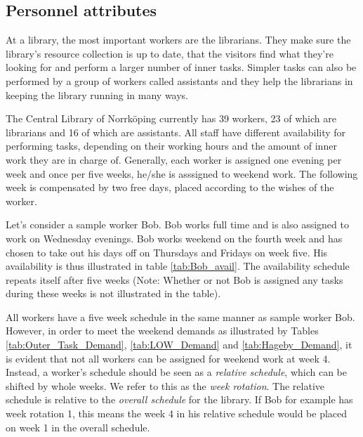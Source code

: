 \subsection{Personnel attributes}

At a library, the most important workers are the librarians. They make sure the library's resource collection is up to date, that the visitors find what they're looking for and perform a larger number of inner tasks. Simpler tasks can also be performed by a group of workers called assistants and they help the librarians in keeping the library running in many ways.

The Central Library of Norrköping currently has 39 workers, 23 of which are librarians and 16 of which are assistants. All staff have different availability for performing tasks, depending on their working hours and the amount of inner work they are in charge of. Generally, each worker is assigned one evening per week and once per five weeks, he/she is asssigned to weekend work. The following week is compensated by two free days, placed according to the wishes of the worker.

Let's consider a sample worker Bob. Bob works full time and is also assigned to work on Wednesday evenings. Bob works weekend on the fourth week and has chosen to take out his days off on Thursdays and Fridays on week five. His availability is thus illustrated in table \ref{tab:Bob_avail}. The availability schedule repeats itself after five weeks (Note: Whether or not Bob is assigned any tasks during these weeks is not illustrated in the table).

All workers have a five week schedule in the same manner as sample worker Bob. However, in order to meet the weekend demands as illustrated by Tables \ref{tab:Outer_Task_Demand}, \ref{tab:LOW_Demand} and \ref{tab:Hageby_Demand}, it is evident that not all workers can be assigned for weekend work at week 4. Instead, a worker's schedule should be seen as a \textit{relative schedule}, which can be shifted by whole weeks. We refer to this as the \textit{week rotation}. The relative schedule is relative to the \textit{overall schedule} for the library. If Bob for example has week rotation 1, this means the week 4 in his relative schedule would be placed on week 1 in the overall schedule.



